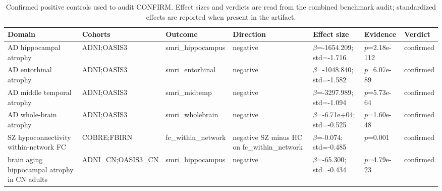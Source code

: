\begin{table}[t]
\centering
\caption{Confirmed positive controls used to audit CONFIRM. Effect sizes and verdicts are read from the combined benchmark audit; standardized effects are reported when present in the artifact.}
\label{tab:positives}
\scriptsize
\setlength{\tabcolsep}{3pt}
\begin{tabular}{@{}p{}p{}p{}p{}p{}p{}p{}@{}}
\toprule
Domain & Cohorts & Outcome & Direction & Effect size & Evidence & Verdict \\
\midrule
AD hippocampal atrophy & ADNI;OASIS3 & smri\_hippocampus & negative & $\beta$=-1654.209; std=-1.716 & $p$=2.18e-112 & confirmed \\
AD entorhinal atrophy & ADNI;OASIS3 & smri\_entorhinal & negative & $\beta$=-1048.840; std=-1.582 & $p$=6.07e-89 & confirmed \\
AD middle temporal atrophy & ADNI;OASIS3 & smri\_midtemp & negative & $\beta$=-3297.989; std=-1.094 & $p$=5.73e-64 & confirmed \\
AD whole-brain atrophy & ADNI;OASIS3 & smri\_wholebrain & negative & $\beta$=-6.71e+04; std=-0.525 & $p$=1.60e-48 & confirmed \\
SZ hypoconnectivity within-network FC & COBRE;FBIRN & fc\_within\_network & negative SZ minus HC on fc\_within\_network & $\beta$=-0.074; std=-0.485 & $p$=0.001 & confirmed \\
brain aging hippocampal atrophy in CN adults & ADNI\_CN;OASIS3\_CN & smri\_hippocampus & negative & $\beta$=-65.300; std=-0.434 & $p$=4.79e-23 & confirmed \\
\bottomrule
\end{tabular}
\end{table}
